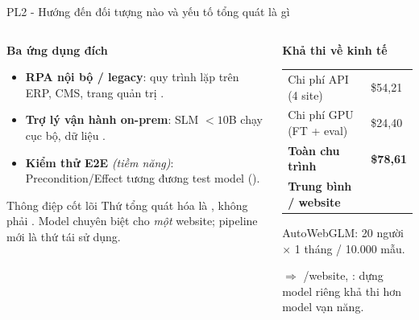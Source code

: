 \begin{frame}{PL2 - Hướng đến đối tượng nào và yếu tố tổng quát là gì}
  \begin{columns}[t]

    \begin{column}{0.48\textwidth}
      \textbf{Ba ứng dụng đích}
      \begin{itemize}\isub
        \item \textbf{RPA nội bộ / legacy}: quy trình lặp trên ERP, CMS, trang quản trị .
        \item \textbf{Trợ lý vận hành on-prem}: SLM ${<}10$B chạy cục bộ, dữ liệu .
        \item \textbf{Kiểm thử E2E} \textit{(tiềm năng)}: Precondition/Effect tương đương test model ().
      \end{itemize}


      \gap
      \begin{block}{Thông điệp cốt lõi}
        Thứ tổng quát hóa là , không phải . Model chuyên biệt cho \emph{một} website; pipeline mới là thứ tái sử dụng.
      \end{block}
    \end{column}
    \hfill
    \begin{column}{0.48\textwidth}
      \textbf{Khả thi về kinh tế}

      \gap
      \tsep
      \begin{table}
        \begin{tabular}{@{}L{3.7cm} R{1.4cm}@{}}
          \toprule
          Chi phí API (4 site) & \$54,21 \\
          Chi phí GPU (FT + eval) & \$24,40 \\
          \midrule
          \textbf{Toàn chu trình} & \textbf{\$78,61} \\
          \textbf{Trung bình / website} &  \\
          \bottomrule
        \end{tabular}
      \end{table}

      {\scriptsize AutoWebGLM: 20 người $\times$ 1 tháng / 10.000 mẫu.}

      \gap
      $\Rightarrow$ /website, : dựng model riêng khả thi hơn model vạn năng.
    \end{column}
  \end{columns}
\end{frame}

